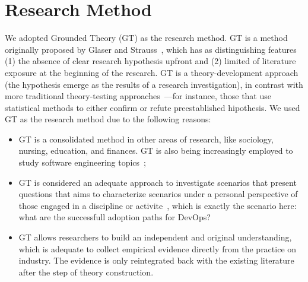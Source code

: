 \section{Research Method} \label{sec:research_method}

We adopted Grounded Theory (GT) as the research method. GT is a method
originally proposed by Glaser and Strauss~\cite{glase1967discovery}, which has
as distinguishing features (1) the absence of clear research hypothesis upfront
and (2) limited of literature exposure at the beginning of the research. GT
is a theory-development approach (the hypothesis emerge as the results of
a research investigation), in contrast with more traditional
theory-testing approaches~\cite{coleman2007using}---for instance,  those that
use statistical methods to either confirm or refute preestablished hipothesis. 
We used GT as the research method due to the following reasons:



\begin{itemize}

\item GT is a consolidated method in other areas of research, like sociology,
nursing, education, and finances. GT is also being increasingly employed
to study software engineering topics~\cite{Hoda:2017:ICSE,stol2016grounded,Waterman:2015:ICSE};

\item GT is considered an adequate approach to investigate scenarios that present 
  questions that aims to characterize scenarios under a personal perspective of those
  engaged in a discipline or activite~\cite{barnsteiner2002using},
which is exactly the scenario here: what are the successfull adoption paths for DevOps?

\item GT allows researchers to build an independent and original understanding, 
which is adequate to collect empirical evidence directly from the
practice on industry. The evidence
is only reintegrated back with the existing literature after the step of
theory construction.

\end{itemize}

